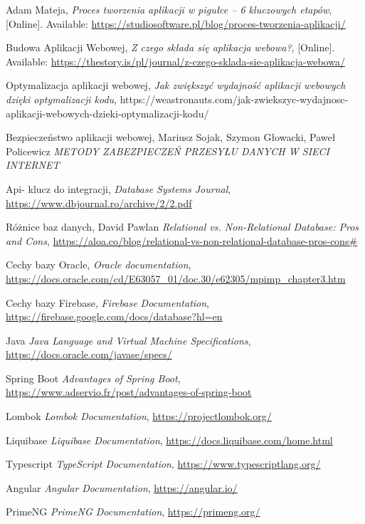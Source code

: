 \begin{thebibliography}{99}
\small

Adam Mateja, \emph{Proces tworzenia aplikacji w pigułce – 6 kluczowych etapów}, [Online]. Available: \url{https://studiosoftware.pl/blog/proces-tworzenia-aplikacji/}

Budowa Aplikacji Webowej, \emph{Z czego składa się aplikacja webowa?}, [Online]. Available: \url{https://thestory.is/pl/journal/z-czego-sklada-sie-aplikacja-webowa/}

Optymalizacja aplikacji webowej, \emph{Jak zwiększyć wydajność aplikacji webowych dzięki optymalizacji kodu}, https://weastronauts.com/jak-zwiekszyc-wydajnosc-aplikacji-webowych-dzieki-optymalizacji-kodu/

Bezpieczeństwo aplikacji webowej,  Mariusz Sojak, Szymon Głowacki, Paweł Policewicz \emph{METODY ZABEZPIECZEŃ PRZESYŁU DANYCH
W SIECI INTERNET}

Api- klucz do integracji, \emph{Database Systems Journal}, \url{https://www.dbjournal.ro/archive/2/2.pdf}

Różnice baz danych, David Pawlan \emph{Relational vs. Non-Relational Database: Pros and Cons}, \url{https://aloa.co/blog/relational-vs-non-relational-database-pros-cons#}

Cechy bazy Oracle, \emph{Oracle documentation}, \url{https://docs.oracle.com/cd/E63057_01/doc.30/e62305/mpimp_chapter3.htm}

Cechy bazy Firebase, \emph{Firebase Documentation}, \url{https://firebase.google.com/docs/database?hl=en}

Java \emph{Java Language and Virtual Machine Specifications},
\url{https://docs.oracle.com/javase/specs/}

Spring Boot \emph{Advantages of Spring Boot}, \url{https://www.adservio.fr/post/advantages-of-spring-boot}

Lombok \emph{Lombok Documentation}, \url{https://projectlombok.org/}

Liquibase \emph{Liquibase Documentation}, \url{https://docs.liquibase.com/home.html}

Typescript \emph{TypeScript Documentation}, \url{https://www.typescriptlang.org/}

Angular \emph{Angular Documentation}, \url{https://angular.io/}

PrimeNG \emph{PrimeNG Documentation}, \url{https://primeng.org/}


\end{thebibliography}
